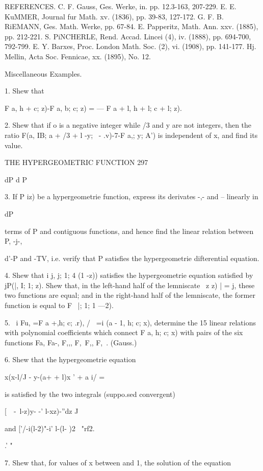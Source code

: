 REFERENCES. C. F. Gauss, Ges. Werke, in. pp. 12.3-163, 207-229. E. E.
KuMMER, Journal fur Math. xv. (1836), pp. 39-83, 127-172. G. F. B.
RiEMANN, Ges. Math. Werke, pp. 67-84. E. Papperitz, Math. Ann. xxv.
(1885), pp. 212-221. S. PiNCHERLE, Rend. Accad. Lincei (4), iv.
(1888), pp. 694-700, 792-799. E. Y. Barxes, Proc. London Math. Soc.
(2), vi. (1908), pp. 141-177. Hj. Mellin, Acta Soc. Fennicae, xx.
(1895), No. 12.

Miscellaneous Examples.

1. Shew that

F a, h + \; c; z)-F a, b; c; z) = — F a + l, h + l; c + l; z).

2. Shew that if o is a negative integer while /3 and y are not
integers, then the ratio F(a, IB; a + /3 + l -y; \ - .v)-7-F a,; y;
A') is independent of x, and find its value.

THE HYPERGEOMETRIC FUNCTION 297

dP d P

3. If P iz) be a hypergeometrie function, express its derivates -,-
and -- linearly in

dP

terms of P and contiguous functions, and hence find the linear
relation between P, -j-,

d'-P and -TV, i.e. verify that P satisfies the hypergeometrie
difterential equation.

4. Shew that i j, j; 1; 4 (1 -z)) satisfies the hypergeometrie
equation satisfied by jP(|, I; 1; z). Shew that, in the left-hand
half of the lemniscate \ z z) | = j, these two functions are equal;
and in the right-hand half of the lemniscate, the former function is
equal to F \, |; 1; 1 —2).

5. \ i Fu, =F a +,h; c; .r), / \ =i (a - 1, h; c; x), determine the
15 linear relations with polynomial coefficients which connect F a, h;
c; x) with pairs of the six functions Fa, Fa-, F,,, F,\, F,, F,\ .
(Gauss.)

6. Shew that the hypergeometrie equation

x(x-l/J - y-(a+ + l)x ' + a i/ =

is satisfied by the two integrals (suppo.sed convergent)

[\ \ -\ l-z)y- -' l-xz)-''dz J

and ['/-i(l-2)"-i' l-(l- )2 ~"rf2.

.' "

7. Shew that, for values of x between and 1, the solution of the
equation

